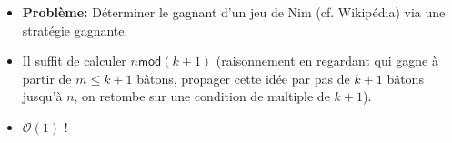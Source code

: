 \begin{frame}
    \frametitle{\problemtitle}
    \begin{itemize}
        \item<+-> \textbf{Problème:} Déterminer le gagnant d'un jeu de Nim (cf. Wikipédia) via une stratégie gagnante.
        \item<+-> Il suffit de calculer $n \mathsf{mod} (k + 1)$ (raisonnement en regardant qui gagne à partir de $m \le k+1$ bâtons, propager cette idée par pas de $k+1$ bâtons jusqu'à $n$, on retombe sur une condition de multiple de $k+1$).
        \item<+-> $\mathcal O(1)$ !
    \end{itemize}
\end{frame}
